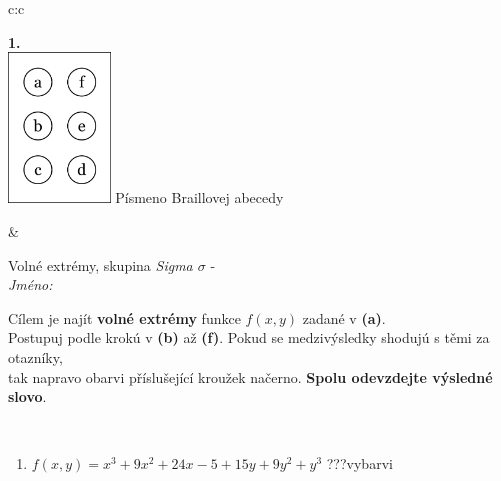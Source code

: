 \documentclass[10pt]{report}
\begin{document}
\begin{tabular}{c:c}
\begin{minipage}[c][104.5mm][t]{0.5\linewidth}
\begin{center}
\begin{minipage}{0.79\linewidth}
\begin{center}
\begin{varwidth}{\linewidth}
\begin{enumerate}
\end{enumerate}
\end{varwidth}
\end{center}
\end{minipage}
\begin{minipage}{0.20\linewidth}
\begin{center}
{\Huge\bfseries 1.} \\[2mm]
\includegraphics[height=40mm]{../images/braille.png}
{\small Písmeno Braillovej abecedy}
\end{center}
\end{minipage}
\end{center}
\end{minipage}
&
\begin{minipage}[c][104.5mm][t]{0.5\linewidth}
\begin{center}
\vspace{7mm}
{\huge Volné extrémy, skupina \textit{Sigma $\sigma$} -}\\[5mm]
\textit{Jméno:}\phantom{xxxxxxxxxxxxxxxxxxxxxxxxxxxxxxxxxxxxxxxxxxxxxxxxxxxxxxxxxxxxxxxxx}\\[5mm]
\begin{minipage}{0.95\linewidth}
\begin{center}
Cílem je najít \textbf{volné extrémy} funkce $f(x,y)$ zadané v \textbf{(a)}.\\Postupuj podle krokú v \textbf{(b)} až \textbf{(f)}. Pokud se medzivýsledky shodujú s těmi za otazníky,\\tak napravo obarvi příslušející kroužek načerno. \textbf{Spolu odevzdejte výsledné slovo}.
\end{center}
\end{minipage}
\\[1mm]
\begin{minipage}{0.79\linewidth}
\begin{center}
\begin{varwidth}{\linewidth}
\begin{enumerate}
\normalsize
\item $f(x,y)=x^3+9x^2+24x-5+15y+9y^2+y^3$\quad \dotfill\; ???\;\dotfill \quad vybarvi

\end{enumerate}
\end{varwidth}
\end{center}
\end{minipage}
\end{center}
\end{minipage}
\end{tabular}
\end{document}
